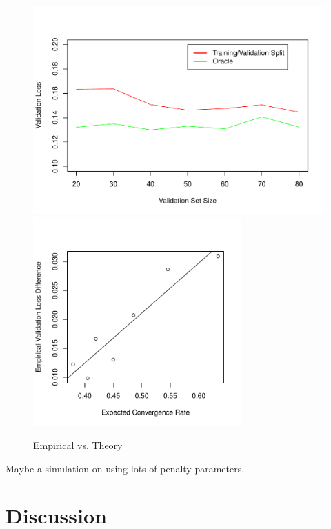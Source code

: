 \documentclass[12pt]{article}
\begin{document}
\begin{figure}
\label{fig:emp_v_theory}
\caption{Empirical vs. Theory}
\centering
\includegraphics[height=80mm]{../R/figures/validation_size_loss.pdf}
\includegraphics[height=80mm]{../R/figures/qqplot.pdf}
\end{figure}

Maybe a simulation on using lots of penalty parameters.

\section{Discussion}\label{sec:discussion}

\end{document}
